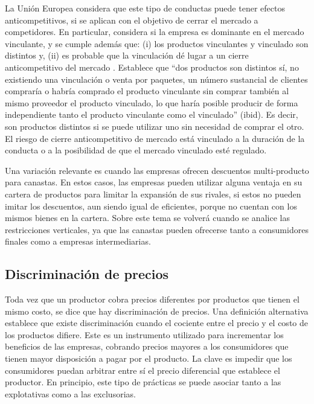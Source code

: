 \documentclass[
  12pt,
  spanish,
]{book}
\begin{document}
La Unión Europea considera que este tipo de conductas puede tener efectos anticompetitivos, si se aplican con el objetivo de cerrar el mercado a competidores. En particular, considera si la empresa es dominante en el mercado vinculante, y se cumple además que: (i) los productos vinculantes y vinculado son distintos y, (ii) es probable que la vinculación dé lugar a un cierre anticompetitivo del mercado \citep[p.~C 45/15]{UE2009}. Establece que ``dos productos son distintos sí, no existiendo una vinculación o venta por paquetes, un número sustancial de clientes compraría o habría comprado el producto vinculante sin comprar también al mismo proveedor el producto vinculado, lo que haría posible producir de forma independiente tanto el producto vinculante como el vinculado'' (ibid). Es decir, son productos distintos si se puede utilizar uno sin necesidad de comprar el otro. El riesgo de cierre anticompetitivo de mercado está vinculado a la duración de la conducta o a la posibilidad de que el mercado vinculado esté regulado.

Una variación relevante es cuando las empresas ofrecen descuentos multi-producto para canastas. En estos casos, las empresas pueden utilizar alguna ventaja en su cartera de productos para limitar la expansión de sus rivales, si estos no pueden imitar los descuentos, aun siendo igual de eficientes, porque no cuentan con los mismos bienes en la cartera. Sobre este tema se volverá cuando se analice las restricciones verticales, ya que las canastas pueden ofrecerse tanto a consumidores finales como a empresas intermediarias.

\hypertarget{discriminaciuxf3n-de-precios}{%
\subsection{Discriminación de precios}\label{discriminaciuxf3n-de-precios}}

Toda vez que un productor cobra precios diferentes por productos que tienen el mismo costo, se dice que hay discriminación de precios. Una definición alternativa establece que existe discriminación cuando el cociente entre el precio y el costo de los productos difiere. Este es un instrumento utilizado para incrementar los beneficios de las empresas, cobrando precios mayores a los consumidores que tienen mayor disposición a pagar por el producto. La clave es impedir que los consumidores puedan arbitrar entre sí el precio diferencial que establece el productor. En principio, este tipo de prácticas se puede asociar tanto a las explotativas como a las exclusorias.
\end{document}
